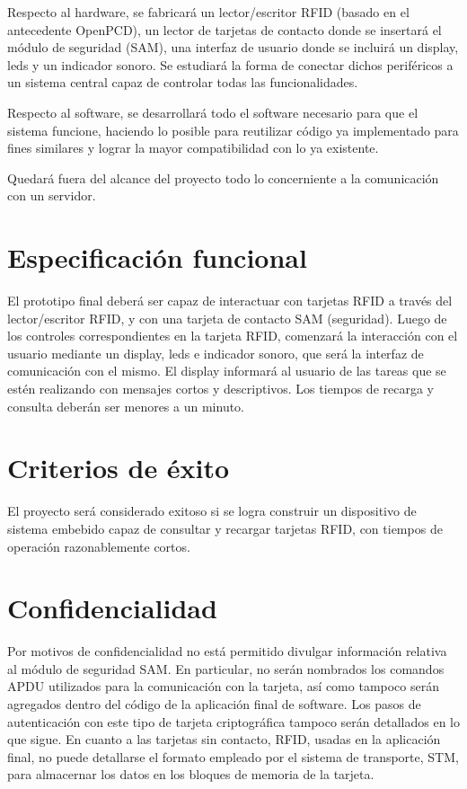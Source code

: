Respecto al hardware, se fabricará un lector/escritor RFID (basado en el antecedente OpenPCD), un lector de tarjetas de contacto donde se insertará el módulo de seguridad (SAM), una interfaz de usuario donde se incluirá un display, leds y  un indicador sonoro. Se estudiará la forma de conectar dichos periféricos a un sistema central capaz de controlar todas las funcionalidades.

\bigskip
Respecto al software, se desarrollará todo el software necesario para que el sistema funcione, haciendo lo posible para reutilizar código ya implementado para fines similares y lograr la mayor compatibilidad con lo ya existente.

\bigskip
Quedará fuera del alcance del proyecto todo lo concerniente a la comunicación con un servidor.


\section{Especificación funcional}

El prototipo final deberá ser capaz de interactuar con tarjetas RFID a través del \\
lector/escritor RFID, y con una tarjeta de contacto SAM (seguridad). Luego de los controles correspondientes en la tarjeta RFID, comenzará la interacción con el usuario mediante un display, leds e indicador sonoro, que será la interfaz de comunicación con el mismo. El display informará al usuario de las tareas que se estén realizando con mensajes cortos y descriptivos. Los tiempos de recarga y consulta deberán ser menores a un minuto.


\section{Criterios de éxito}

El proyecto será considerado exitoso si se logra construir un dispositivo de sistema embebido capaz de consultar y recargar tarjetas RFID, con tiempos de operación razonablemente cortos.

\section{Confidencialidad}

Por motivos de confidencialidad no está permitido divulgar información relativa al módulo de seguridad SAM. 
En particular, no serán nombrados los comandos APDU utilizados para la comunicación con la tarjeta, así como 
tampoco serán agregados dentro del código de la aplicación final de software. Los pasos de autenticación
con este tipo de tarjeta criptográfica tampoco serán detallados en lo que sigue.
En cuanto a las tarjetas sin contacto, RFID, usadas en la aplicación final, no puede detallarse el formato
empleado por el sistema de transporte, STM, para almacernar los datos en los bloques de memoria de la tarjeta.